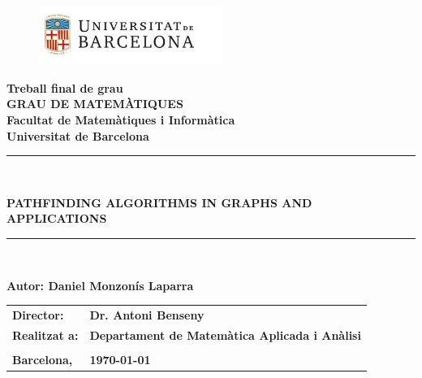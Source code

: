 \documentclass[a4paper,10pt]{report}
\begin{document}
\pagestyle{empty}

\begin{titlepage}
\begin{center}
\begin{figure}[htb]
\begin{center}
\includegraphics[width=6cm]{ub.png}
\end{center}
\end{figure}

\textbf{\LARGE Treball final de grau} \\
\vspace*{.5cm}
\textbf{\LARGE GRAU DE MATEMÀTIQUES } \\
\vspace*{.5cm}
\textbf{\LARGE Facultat de Matemàtiques i Informàtica \\ Universitat de Barcelona} \\
\vspace*{1.5cm}
\rule{16cm}{0.1mm}\\
\begin{Huge}
\textbf{PATHFINDING ALGORITHMS IN GRAPHS AND APPLICATIONS} \\
\end{Huge}
\rule{16cm}{0.1mm}\\

\vspace{1cm}

\begin{flushright}
\textbf{\LARGE Autor: Daniel Monzonís Laparra}

\vspace*{2cm}

\renewcommand{\arraystretch}{1.5}
\begin{tabular}{ll}
\textbf{\Large Director:} & \textbf{\Large Dr. Antoni Benseny} \\
\textbf{\Large Realitzat a:} & \textbf{\Large  Departament de Matemàtica Aplicada i Anàlisi} \\
\\
\textbf{\Large Barcelona,} & \textbf{\Large \today }
\end{tabular}

\end{flushright}
\end{center}
\end{titlepage}
\end{document}
